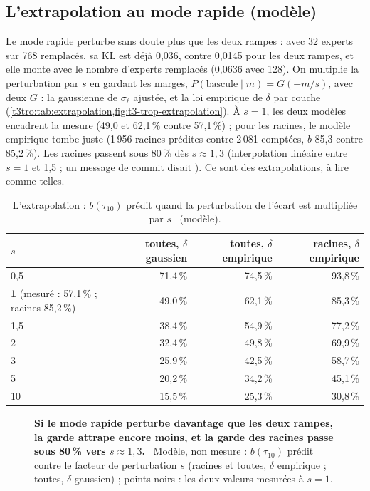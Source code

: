\subsection{L'extrapolation au mode rapide (modèle)}\label{t3tro:sec:extrapolation}

Le mode rapide perturbe sans doute plus que les deux rampes : avec 32 experts sur 768 remplacés, sa KL est déjà 0,036, contre 0,0145 pour les deux rampes, et elle monte avec le nombre d'experts remplacés (0,0636 avec 128). On multiplie la perturbation par $s$ en gardant les marges, $P(\text{bascule} \mid m) = G(-m/s)$, avec deux $G$ : la gaussienne de $\sigma_\ell$ ajustée, et la loi empirique de $\delta$ par couche (\cref{t3tro:tab:extrapolation,fig:t3-trop-extrapolation}). À $s = 1$, les deux modèles encadrent la mesure (49,0 et 62,1\,\% contre 57,1\,\%) ; pour les racines, le modèle empirique tombe juste (1\,956 racines prédites contre 2\,081 comptées, $b$ 85,3 contre 85,2\,\%). Les racines passent sous 80\,\% dès $s \approx 1{,}3$ (interpolation linéaire entre $s = 1$ et 1,5 ; un message de commit disait ). Ce sont des extrapolations, à lire comme telles.

\begin{table}[tbp]
\centering\small
\caption[L'extrapolation de la garde]{L'extrapolation : $b(\tau_{10})$ prédit quand la perturbation de l'écart est multipliée par $s$ \calc~(modèle).}
\label{t3tro:tab:extrapolation}
\begin{tabular}{@{}lrrr@{}}
\toprule
$s$ & toutes, $\delta$ gaussien & toutes, $\delta$ empirique & racines, $\delta$ empirique \\
\midrule
0,5 & 71,4\,\% & 74,5\,\% & 93,8\,\% \\
\textbf{1} (mesuré : 57,1\,\% ; racines 85,2\,\%) & 49,0\,\% & 62,1\,\% & 85,3\,\% \\
1,5 & 38,4\,\% & 54,9\,\% & 77,2\,\% \\
2 & 32,4\,\% & 49,8\,\% & 69,9\,\% \\
3 & 25,9\,\% & 42,5\,\% & 58,7\,\% \\
5 & 20,2\,\% & 34,2\,\% & 45,1\,\% \\
10 & 15,5\,\% & 25,3\,\% & 30,8\,\% \\
\bottomrule
\end{tabular}
\end{table}

\begin{figure}[tbp]
\centering
\GrapheTropicaleExtrapolation
\caption[L'extrapolation de la garde (modèle)]{\textbf{Si le mode rapide perturbe davantage que les deux rampes, la garde attrape encore moins, et la garde des racines passe sous 80\,\% vers $s \approx 1{,}3$.} \calc~Modèle, non mesure : $b(\tau_{10})$ prédit contre le facteur de perturbation $s$ (racines et toutes, $\delta$ empirique ; toutes, $\delta$ gaussien) ; points noirs : les deux valeurs mesurées à $s = 1$. }
\label{fig:t3-trop-extrapolation}
\end{figure}

